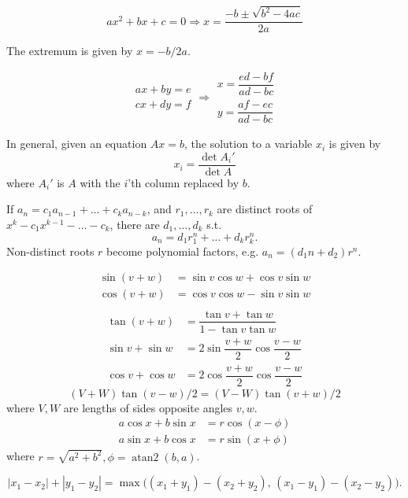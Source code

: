 

\[ax^2+bx+c=0 \Rightarrow x = \frac{-b\pm\sqrt{b^2-4ac}}{2a}\]

The extremum is given by $x = -b/2a$.

\[\begin{aligned}ax+by=e\\cx+dy=f\end{aligned}
\Rightarrow
\begin{aligned}x=\dfrac{ed-bf}{ad-bc}\\y=\dfrac{af-ec}{ad-bc}\end{aligned}\]

In general, given an equation $Ax = b$, the solution to a variable $x_i$ is given by
\[x_i = \frac{\det A_i'}{\det A} \]
where $A_i'$ is $A$ with the $i$'th column replaced by $b$.

If $a_n = c_1 a_{n-1} + \dots + c_k a_{n-k}$, and $r_1, \dots, r_k$ are distinct roots of $x^k - c_1 x^{k-1} - \dots - c_k$, there are $d_1, \dots, d_k$ s.t.
\[a_n = d_1r_1^n + \dots + d_kr_k^n. \]
Non-distinct roots $r$ become polynomial factors, e.g. $a_n = (d_1n + d_2)r^n$.

\begin{align*}
\sin(v+w)&{}=\sin v\cos w+\cos v\sin w\\
\cos(v+w)&{}=\cos v\cos w-\sin v\sin w\\
\end{align*}
\begin{align*}
\tan(v+w)&{}=\dfrac{\tan v+\tan w}{1-\tan v\tan w}\\
\sin v+\sin w&{}=2\sin\dfrac{v+w}{2}\cos\dfrac{v-w}{2}\\
\cos v+\cos w&{}=2\cos\dfrac{v+w}{2}\cos\dfrac{v-w}{2}
\end{align*}
\[ (V+W)\tan(v-w)/2{}=(V-W)\tan(v+w)/2 \]
where $V, W$ are lengths of sides opposite angles $v, w$.
\begin{align*}
	a\cos x+b\sin x&=r\cos(x-\phi)\\
	a\sin x+b\cos x&=r\sin(x+\phi)
\end{align*}
where $r=\sqrt{a^2+b^2}, \phi=\operatorname{atan2}(b,a)$.

\[ |x_1-x_2|+|y_1-y_2|=\max\big((x_1+y_1)-(x_2+y_2),\,(x_1-y_1)-(x_2-y_2)\big). \]


